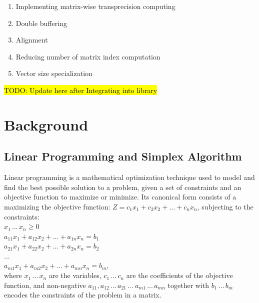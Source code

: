 \documentclass[logo,bsc,singlespacing,parskip]{infthesis}
\newenvironment{compactlist}
{ \begin{enumerate}
    \setlength{\itemsep}{0pt}
    \setlength{\parskip}{0pt}
    \setlength{\parsep}{0pt}     
}
{ \end{enumerate} }
\begin{document}
\begin{compactlist} 
    \item Implementing matrix-wise transprecision computing 
    \item Double buffering
    \item Alignment
    \item Reducing number of matrix index computation
    \item Vector size specialization
\end{compactlist}

\hl{TODO: Update here after Integrating into library}



\chapter{Background}
\section{Linear Programming and Simplex Algorithm}
Linear programming is a mathematical optimization technique used to model and
find the best possible solution to a problem, given a set of constraints and an
objective function to maximize or minimize. Its canonical form consists of a
maximizing the objective function:
\begin{math}
Z = c_1x_1 + c_2x_2 + ... + c_nx_n
\end{math}, subjecting to the constraints: \\
\begin{math}
x_1 \, ... \, x_n \ge 0
\end{math}\\
\begin{math}
a_{11}x_1 + a_{12}x_2 + ... + a_{1n}x_n = b_1 
\end{math}\\
\begin{math}
a_{21}x_1 + a_{22}x_2 + ... + a_{2n}x_n = b_2
\end{math}\\
\begin{math}
...
\end{math}\\
\begin{math}
a_{m1}x_1 + a_{m2}x_2 + ... + a_{mn}x_n = b_m
\end{math}, \\
where \begin{math}x_1 \,...\, x_n\end{math} are the variables, 
\begin{math}c_1 \,...\, c_n\end{math} are the coefficients of the objective function, 
and non-negative \begin{math}a_{11}, a_{12} \,...\, a_{21} \,...\ a_{m1} \,...\, a_{mn}\end{math}
together with \begin{math}b_1 \,...\, b_m\end{math} encodes the constraints of
the problem in a matrix. 
\end{document}
